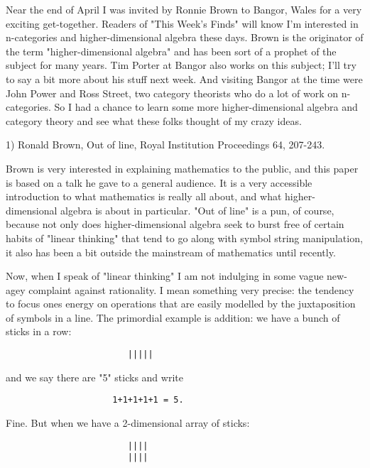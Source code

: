 

Near the end of April I was invited by Ronnie Brown to 
Bangor, Wales for a very exciting get-together.  Readers of
"This Week's Finds" will know I'm interested in n-categories
and higher-dimensional algebra these days.  Brown is
the originator of the term "higher-dimensional algebra"
and has been sort of a prophet of the subject for many years.
Tim Porter at Bangor also works on this subject; 
I'll try to say a bit more about his stuff next week.  And visiting
Bangor at the time were John Power and Ross Street, two category 
theorists who do a lot of work on n-categories.   So I had a chance 
to learn some more higher-dimensional algebra and category theory
and see what these folks thought of my crazy ideas.

1) Ronald Brown, Out of line, Royal Institution Proceedings
64, 207-243.


Brown is very interested in explaining mathematics to the
public, and this paper is based on a talk he gave to a 
general audience.  It is a very accessible introduction to what
mathematics is really all about, and what higher-dimensional
algebra is about in particular.   "Out of line" is a pun, of
course, because not only does higher-dimensional algebra seek
to burst free of certain habits of "linear thinking" that tend
to go along with symbol string manipulation, it also has been
a bit outside the mainstream of mathematics until recently.  

Now, when I speak of "linear thinking" I am not indulging in
some vague new-agey complaint against rationality.  I mean
something very precise: the tendency to focus ones energy
on operations that are easily modelled by the juxtaposition
of symbols in a line.  The primordial example is addition:
we have a bunch of sticks in a row:

\begin{verbatim}
                        |||||
\end{verbatim}
    

and we say there are "5" sticks and write

\begin{verbatim}
                     1+1+1+1+1 = 5.
\end{verbatim}
    

Fine.  But when we have a 2-dimensional array of sticks:

\begin{verbatim}
                        ||||
                        ||||
\end{verbatim}
    
